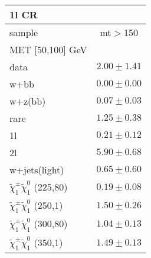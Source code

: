 \begin{table}
\begin{center}
\small
\begin{tabular}{lc}
\hline
1l CR & \\
\hline
sample&mt$>$150\\
\hline
MET [50,100] GeV &  \\
\hline
data&$2.00\pm1.41$\\
\hline
w+bb&$0.00\pm0.00$\\
w+z(bb)&$0.07\pm0.03$\\
rare&$1.25\pm0.38$\\
1l&$0.21\pm0.12$\\
2l&$5.90\pm0.68$\\
w+jets(light)&$0.65\pm0.60$\\
$\tilde{\chi}_{1}^{\pm}\tilde{\chi}_{1}^{0}$ (225,80)&$0.19\pm0.08$\\
$\tilde{\chi}_{1}^{\pm}\tilde{\chi}_{1}^{0}$ (250,1)&$1.50\pm0.26$\\
$\tilde{\chi}_{1}^{\pm}\tilde{\chi}_{1}^{0}$ (300,80)&$1.04\pm0.13$\\
$\tilde{\chi}_{1}^{\pm}\tilde{\chi}_{1}^{0}$ (350,1)&$1.49\pm0.13$\\
\hline
\hline\hline
\hline
\end{tabular}
\end{center}
\end{table}
